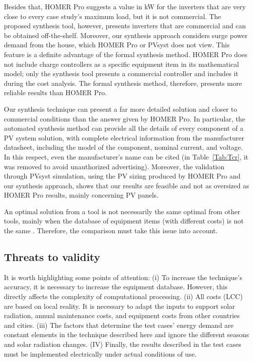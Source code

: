 \documentclass[10pt,journal,compsoc]{IEEEtran}
\begin{document}
Besides that, HOMER Pro suggests a value in kW for the inverters that are very close to every case study's maximum load, but it is not commercial. The proposed synthesis tool, however, presents inverters that are commercial and can be obtained off-the-shelf. Moreover, our synthesis approach considers surge power demand from the house, which HOMER Pro or PVsyst does not view. This feature is a definite advantage of the formal synthesis method. HOMER Pro does not include charge controllers as a specific equipment item in its mathematical model; only the synthesis tool presents a commercial controller and includes it during the cost analysis. The formal synthesis method, therefore, presents more reliable results than HOMER Pro.

Our synthesis technique can present a far more detailed solution and closer to commercial conditions than the answer given by HOMER Pro. In particular, the automated synthesis method can provide all the details of every component of a PV system solution, with complete electrical information from the manufacturer datasheet, including the model of the component, nominal current, and voltage. In this respect, even the manufacturer's name can be cited (in Table~\ref{Tab:Tcr}, it was removed to avoid unauthorized advertising). Moreover, the validation through PVsyst simulation, using the PV sizing produced by HOMER Pro and our synthesis approach, shows that our results are feasible and not as oversized as HOMER Pro results, mainly concerning PV panels.

An optimal solution from a tool is not necessarily the same optimal from other tools, mainly when the database of equipment items (with different costs) is not the same \cite{Alsadi2018}. Therefore, the comparison must take this issue into account. 

\subsection{Threats to validity} 

It is worth highlighting some points of attention: (i) To increase the technique's accuracy, it is necessary to increase the equipment database. However, this directly affects the complexity of computational processing. (ii) All costs (LCC) are based on local reality. It is necessary to adapt the inputs to support solar radiation, annual maintenance costs, and equipment costs from other countries and cities. (iii) The factors that determine the test cases' energy demand are constant elements in the technique described here and ignore the different seasons and solar radiation changes. (IV) Finally, the results described in the test cases must be implemented electrically under actual conditions of use.
\end{document}
